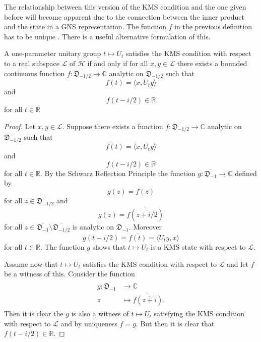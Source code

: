 The relationship between this version of the KMS condition and the one given before will become apparent due to the connection between the inner product and the state in a GNS representation. The function $f$ in the previous definition has to be unique \cite{Duvenhage1999}. There is a useful alternative formulation of this.

\begin{theorem}
A one-parameter unitary group $t\mapsto U_t$ satisfies the KMS condition with respect to a real subspace $\mathcal{L}$ of $\mathcal{H}$ if and only if for all $x,y\in\mathcal{L}$ there exists a bounded continuous function $f:\overline{\mathfrak{D}_{-1/2}}\rightarrow\mathbb{C}$ analytic on $\mathfrak{D}_{-1/2}$ such that
\begin{equation}
f(t)=\langle x, U_t y\rangle
\end{equation}
and 
\begin{equation}
f(t-i/2)\in\mathbb{R}
\end{equation}
for all $t\in\mathbb{R}$
\end{theorem}

\begin{proof}
Let $x,y\in\mathcal{L}$. Suppose there exists a function $f:\overline{\mathfrak{D}_{-1/2}}\rightarrow\mathbb{C}$ analytic on $\mathfrak{D}_{-1/2}$ such that
\begin{equation}
f(t)=\langle x, U_t y\rangle
\end{equation}
and 
\begin{equation}
f(t-i/2)\in\mathbb{R}
\end{equation}
for all $t\in\mathbb{R}$. By the Schwarz Reflection Principle the function $g:\overline{\mathfrak{D}_{-1}}\rightarrow\mathbb{C}$ defined by 
\begin{equation}
g(z)=f(z)
\end{equation}
for all $z\in\overline{\mathfrak{D_{-1/2}}}$ and
\begin{equation}
g(z)=\overline{f(\overline{z+i/2})}
\end{equation}
for all $z\in\overline{\mathfrak{D}_{-1}}\setminus\overline{\mathfrak{D}_{-1/2}}$ is analytic on $\mathfrak{D}_{-1}$. Moreover 
\begin{equation}
g(t-i/2)=\overline{f(t)}=\langle U_t y, x \rangle
\end{equation}
for all $t\in\mathbb{R}$. The function $g$ shows that $t\mapsto U_t$ is a KMS state with respect to $\mathcal{L}$.

Assume now that $t\mapsto U_t$ satisfies the KMS condition with respect to $\mathcal{L}$ and let $f$ be a witness of this. Consider the function
\begin{align}
\begin{split}
g:\overline{\mathfrak{D}_{-1}}&\rightarrow\mathbb{C} \\
z&\mapsto\overline{f(\overline{z+i})}.
\end{split}
\end{align}
Then it is clear the $g$ is also a witness of $t\mapsto U_t$ satisfying the KMS condition with respect to $\mathcal{L}$ and by uniqueness $f=g$. But then it is clear that $f(t-i/2)\in\mathbb{R}$.
\end{proof}

